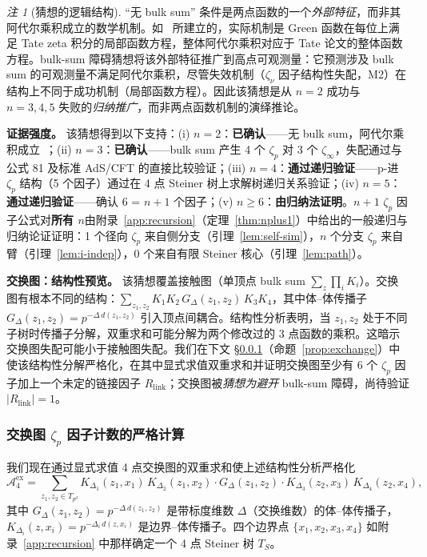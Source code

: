 \documentclass[11pt,a4paper]{ctexart}
\theoremstyle{remark}
\newtheorem{remark}[theorem]{注}
\begin{document}
\begin{remark}[猜想的逻辑结构]
\label{rem:logical}
``无 bulk sum'' 条件是两点函数的一个\emph{外部特征}，而非其阿代尔乘积成立的数学机制。如~\cite{HSYZ20} 所建立的，实际机制是 Green 函数在每位上满足 Tate zeta 积分的局部函数方程，整体阿代尔乘积对应于 Tate 论文的整体函数方程。bulk-sum 障碍猜想将该外部特征推广到高点可观测量：它预测涉及 bulk sum 的可观测量不满足阿代尔乘积，尽管失效机制（$\zeta_\nu$ 因子结构性失配，M2）在结构上不同于成功机制（局部函数方程）。因此该猜想是从 $n=2$ 成功与 $n=3,4,5$ 失败的\emph{归纳推广}，而非两点函数机制的演绎推论。
\end{remark}

\textbf{证据强度。}
该猜想得到以下支持：(i) $n = 2$：\textbf{已确认}——无 bulk sum，阿代尔乘积成立~\cite{HSYZ20}；(ii) $n = 3$：\textbf{已确认}——bulk sum 产生 4 个 $\zeta_p$ 对 3 个 $\zeta_\infty$，失配通过与~\cite{HJ24} 公式 81 及标准 AdS/CFT 的直接比较验证；(iii) $n = 4$：\textbf{通过递归验证}——p-进 $\zeta_p$ 结构（5 个因子）通过在 4 点 Steiner 树上求解树递归关系验证；(iv) $n = 5$：\textbf{通过递归验证}——确认 6 = $n{+}1$ 个因子；(v) $n \geq 6$：\textbf{由归纳法证明}。$n{+}1$ $\zeta_p$ 因子公式对\textbf{所有 $n$}由附录~\ref{app:recursion}（定理~\ref{thm:nplus1}）中给出的一般递归与归纳论证证明：1 个径向 $\zeta_p$ 来自侧分支（引理~\ref{lem:self-sim}），$n$ 个分支 $\zeta_p$ 来自臂（引理~\ref{lem:i-indep}），0 个来自有限 Steiner 核心（引理~\ref{lem:path}）。

\medskip\noindent
\textbf{交换图：结构性预览。}
该猜想覆盖接触图（单顶点 bulk sum $\sum_z \prod_i K_i$）。交换图有根本不同的结构：$\sum_{z_1, z_2} K_1 K_2 \, G_\Delta(z_1, z_2) \, K_3 K_4$，其中体--体传播子 $G_\Delta(z_1, z_2) = p^{-\Delta\,d(z_1,z_2)}$ 引入顶点间耦合。结构性分析表明，当 $z_1, z_2$ 处于不同子树时传播子分解，双重求和可能分解为两个修改过的 3 点函数的乘积。这暗示交换图失配可能小于接触图失配。我们在下文 \S\ref{sec:exchange-rigorous}（命题~\ref{prop:exchange}）中使该结构性分解严格化，在其中显式求值双重求和并证明交换图至少有 6 个 $\zeta_p$ 因子加上一个未定的链接因子 $R_{\mathrm{link}}$；交换图被\emph{猜想为避开} bulk-sum 障碍，尚待验证 $|R_{\mathrm{link}}| = 1$。

\subsubsection{交换图 $\zeta_p$ 因子计数的严格计算}
\label{sec:exchange-rigorous}

我们现在通过显式求值 4 点交换图的双重求和使上述结构性分析严格化
\begin{equation}
\label{eq:exchange-def}
\mathcal{A}^{\mathrm{ex}}_4 = \sum_{z_1, z_2 \in T_{p^d}} K_{\Delta_1}(z_1, x_1)\,K_{\Delta_2}(z_1, x_2) \cdot G_\Delta(z_1, z_2) \cdot K_{\Delta_3}(z_2, x_3)\,K_{\Delta_4}(z_2, x_4),
\end{equation}
其中 $G_\Delta(z_1, z_2) = p^{-\Delta\,d(z_1,z_2)}$ 是带标度维数 $\Delta$（交换维数）的体--体传播子，$K_{\Delta_i}(z, x_i) = p^{-\Delta_i\,d(z, x_i)}$ 是边界--体传播子。四个边界点 $\{x_1, x_2, x_3, x_4\}$ 如附录~\ref{app:recursion} 中那样确定一个 4 点 Steiner 树 $T_S$。
\end{document}
